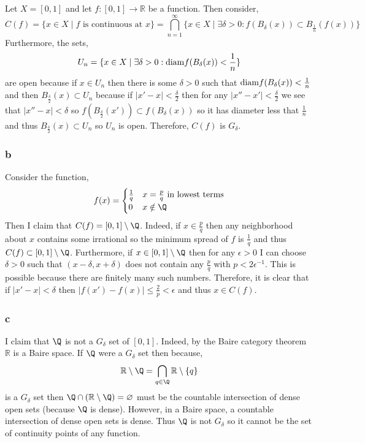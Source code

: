 \documentclass[12pt]{article}
\newcommand{\R}{\mathbb{R}}
\begin{document}
Let $X = [0,1]$ and let $f : [0,1] \to \R$ be a function. Then consider,
\[ C(f) = \{ x \in X \mid f \text{ is continuous at } x \} = \bigcap_{n = 1}^\infty \{ x \in X \mid \exists \delta > 0 : f(B_\delta(x)) \subset B_{\frac{1}{n}}(f(x)) \} \]
Furthermore, the sets,
\[ U_n = \{ x \in X \mid \exists \delta > 0 : \mathrm{diam}{f(B_{\delta}(x))} < \frac{1}{n} \} \]
are open because if $x \in U_n$ then there is some $\delta > 0$ such that $\mathrm{diam}{f(B_\delta(x))} < \frac{1}{n}$ and then $B_{\frac{\delta}{2}}(x) \subset U_n$ because if $|x' - x| < \frac{\delta}{2}$ then for any $|x'' - x'| < \frac{\delta}{2}$ we see that $|x'' - x| < \delta$ so $f(B_{\frac{\delta}{2}}(x')) \subset f(B_\delta(x))$ so it has diameter less that $\frac{1}{n}$ and thus $B_{\frac{\delta}{2}}(x) \subset U_n$ so $U_n$ is open. Therefore, $C(f)$ is $G_\delta$.

\subsubsection{b}

Consider the function,
\[ f(x) = 
\begin{cases}
\frac{1}{q} & x = \frac{p}{q} \text{ in lowest terms}
\\
0 & x \notin \Q 
\end{cases} \]
Then I claim that $C(f) = [0,1] \setminus \Q$. Indeed, if $x \in \frac{p}{q}$ then any neighborhood about $x$ contains some irrational so the minimum spread of $f$ is $\frac{1}{q}$ and thus $C(f) \subset [0, 1] \setminus \Q$. Furthermore, if $x \in [0,1] \setminus \Q$ then for any $\epsilon > 0$ I can choose $\delta > 0$ such that $(x - \delta, x + \delta)$ does not contain any $\frac{p}{q}$ with $p < 2\epsilon^{-1}$. This is possible because there are finitely many such numbers. Therefore, it is clear that if $|x' - x| < \delta$ then $|f(x') - f(x)| \le \frac{2}{p} < \epsilon$ and thus $x \in C(f)$.

\subsubsection{c}

I claim that $\Q$ is not a $G_\delta$ set of $[0, 1]$. Indeed, by the Baire category theorem $\R$ is a Baire space. If $\Q$ were a $G_\delta$ set then because,
\[ \R \setminus \Q = \bigcap_{q \in \Q} \R \setminus \{ q \} \]
is a $G_\delta$ set then $\Q \cap (\R \setminus \Q) = \varnothing$ must be the countable intersection of dense open sets (because $\Q$ is dense). However, in a Baire space, a countable intersection of dense open sets is dense. Thus $\Q$ is not $G_\delta$ so it cannot be the set of continuity points of any function.
\end{document}
